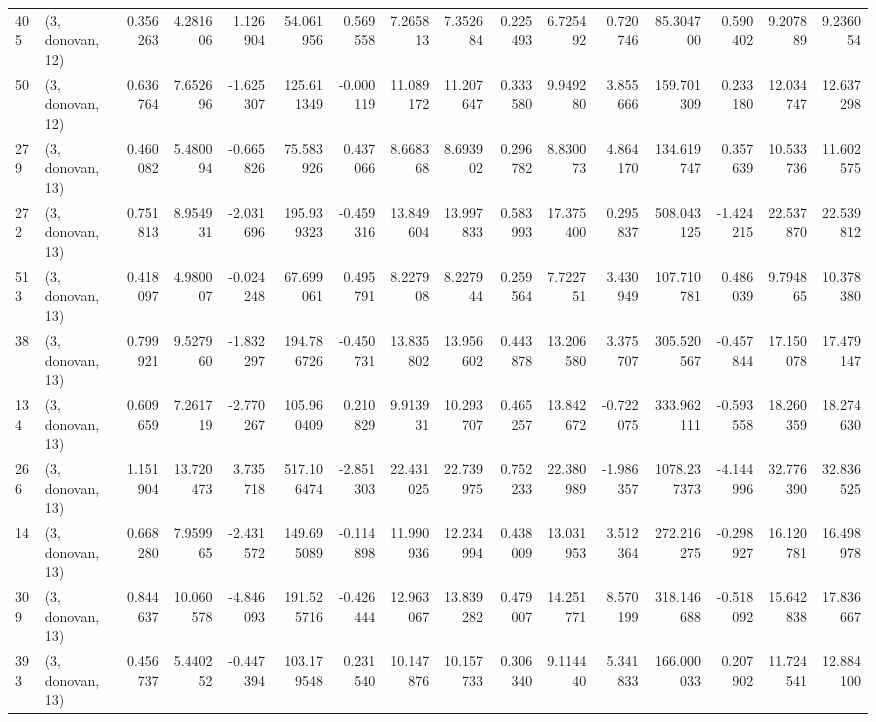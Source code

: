 \begin{tabular}{llrrrrrrrrrrrrrr}
405 &  (3, donovan, 12) &   0.356263 &   4.281606 &   1.126904 &    54.061956 &   0.569558 &   7.265813 &   7.352684 &  0.225493 &   6.725492 &   0.720746 &     85.304700 &   0.590402 &   9.207889 &    9.236054 \\
50  &  (3, donovan, 12) &   0.636764 &   7.652696 &  -1.625307 &   125.611349 &  -0.000119 &  11.089172 &  11.207647 &  0.333580 &   9.949280 &   3.855666 &    159.701309 &   0.233180 &  12.034747 &   12.637298 \\
279 &  (3, donovan, 13) &   0.460082 &   5.480094 &  -0.665826 &    75.583926 &   0.437066 &   8.668368 &   8.693902 &  0.296782 &   8.830073 &   4.864170 &    134.619747 &   0.357639 &  10.533736 &   11.602575 \\
272 &  (3, donovan, 13) &   0.751813 &   8.954931 &  -2.031696 &   195.939323 &  -0.459316 &  13.849604 &  13.997833 &  0.583993 &  17.375400 &   0.295837 &    508.043125 &  -1.424215 &  22.537870 &   22.539812 \\
513 &  (3, donovan, 13) &   0.418097 &   4.980007 &  -0.024248 &    67.699061 &   0.495791 &   8.227908 &   8.227944 &  0.259564 &   7.722751 &   3.430949 &    107.710781 &   0.486039 &   9.794865 &   10.378380 \\
38  &  (3, donovan, 13) &   0.799921 &   9.527960 &  -1.832297 &   194.786726 &  -0.450731 &  13.835802 &  13.956602 &  0.443878 &  13.206580 &   3.375707 &    305.520567 &  -0.457844 &  17.150078 &   17.479147 \\
134 &  (3, donovan, 13) &   0.609659 &   7.261719 &  -2.770267 &   105.960409 &   0.210829 &   9.913931 &  10.293707 &  0.465257 &  13.842672 &  -0.722075 &    333.962111 &  -0.593558 &  18.260359 &   18.274630 \\
266 &  (3, donovan, 13) &   1.151904 &  13.720473 &   3.735718 &   517.106474 &  -2.851303 &  22.431025 &  22.739975 &  0.752233 &  22.380989 &  -1.986357 &   1078.237373 &  -4.144996 &  32.776390 &   32.836525 \\
14  &  (3, donovan, 13) &   0.668280 &   7.959965 &  -2.431572 &   149.695089 &  -0.114898 &  11.990936 &  12.234994 &  0.438009 &  13.031953 &   3.512364 &    272.216275 &  -0.298927 &  16.120781 &   16.498978 \\
309 &  (3, donovan, 13) &   0.844637 &  10.060578 &  -4.846093 &   191.525716 &  -0.426444 &  12.963067 &  13.839282 &  0.479007 &  14.251771 &   8.570199 &    318.146688 &  -0.518092 &  15.642838 &   17.836667 \\
393 &  (3, donovan, 13) &   0.456737 &   5.440252 &  -0.447394 &   103.179548 &   0.231540 &  10.147876 &  10.157733 &  0.306340 &   9.114440 &   5.341833 &    166.000033 &   0.207902 &  11.724541 &   12.884100 \\

\end{tabular}

